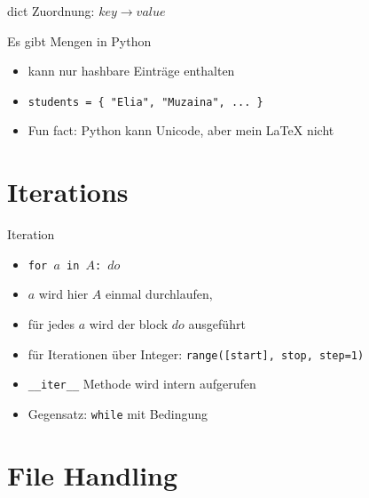 \begin{frame}{dict}
	Zuordnung: $key \to value$
	
\end{frame}


\begin{frame}{Es gibt Mengen in Python}
	\begin{itemize}
		\item kann nur hashbare Einträge enthalten
		\item {\tt students = \{ "{}Elia", "Muzaina", ... \}}
		\item Fun fact: Python kann Unicode, aber mein \LaTeX{} nicht
	\end{itemize}
\end{frame}

\section{Iterations}

\begin{frame}{Iteration}
	\begin{itemize}
		\item {\tt for $a$ in $A$: $do$}
		\item $a$ wird hier $A$ einmal durchlaufen,
		\item für jedes $a$ wird der block $do$ ausgeführt
		\item für Iterationen über Integer: \texttt{range([start], stop, step=1)}
		\item \alert{\texttt{\_\_iter\_\_}} Methode wird intern aufgerufen
		\item<2-> Gegensatz: {\tt while} mit Bedingung
	\end{itemize}
\end{frame}


\section{File Handling}

